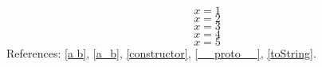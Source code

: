 \documentclass[11pt]{article}
\begin{document}
\[x=1\tag{A}\label{a b}\]
\[x=2\tag{B}\label{a_b}\]
\[x=3\tag{C}\label{constructor}\]
\[x=4\tag{D}\label{__proto__}\]
\[x=5\tag{E}\label{toString}\]
References: \eqref{a b}, \eqref{a_b}, \eqref{constructor}, \eqref{__proto__}, \eqref{toString}.
\end{document}
